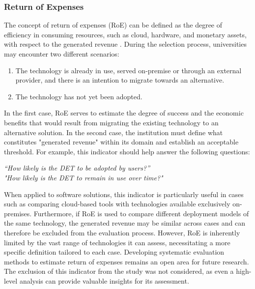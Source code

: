 \subsubsection{Return of Expenses}
The concept of return of expenses (RoE) can be defined as the degree of efficiency in consuming resources, such as cloud, hardware, and monetary assets, with respect to the generated revenue \cite{andrikopoulos_software_2021}.
During the selection process, universities may encounter two different scenarios:
\begin{enumerate}[noitemsep, topsep=4pt, parsep=0pt, partopsep=0pt]
    \item The technology is already in use, served on-premise or through an external provider, and there is an intention to migrate towards an alternative.
    \item The technology has not yet been adopted.
\end{enumerate}
In the first case, RoE serves to estimate the degree of success and the economic benefits that would result from migrating the existing technology to an alternative solution.
In the second case, the institution must define what constitutes "generated revenue" within its domain and establish an acceptable threshold. For example, this indicator should help answer the following questions:
\begin{center}
    \textit{“How likely is the DET to be adopted by users?”} \\
    \textit{"How likely is the DET to remain in use over time?"}
\end{center}
When applied to software solutions, this indicator is particularly useful in cases such as comparing cloud-based tools with technologies available exclusively on-premises. Furthermore, if RoE is used to compare different deployment models of the same technology, the generated revenue may be similar across cases and can therefore be excluded from the evaluation process. However, RoE is inherently limited by the vast range of technologies it can assess, necessitating a more specific definition tailored to each case. Developing systematic evaluation methods to estimate return of expenses remains an open area for future research. The exclusion of this indicator from the study was not considered, as even a high-level analysis can provide valuable insights for its assessment.

